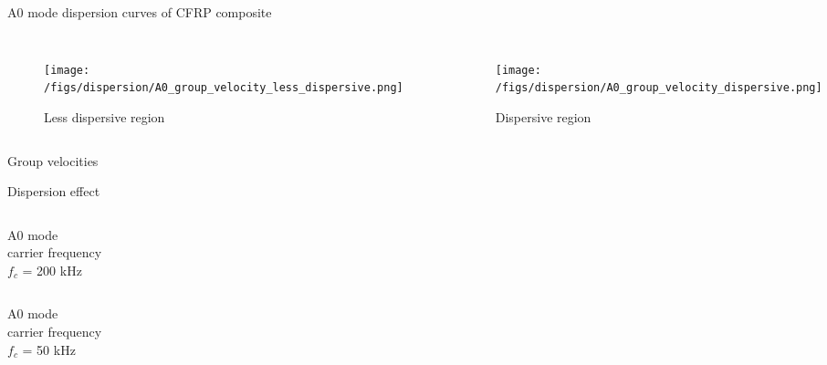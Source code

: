 \documentclass[10pt,aspectratio=169,dvipsnames]{beamer} %
\begin{document}
\begin{frame}{A0 mode dispersion curves of CFRP composite}
	\begin{columns}[T]
			\begin{figure}
				\texttt{[image: /figs/dispersion/A0\_group\_velocity\_less\_dispersive.png]}
				\caption{Less dispersive region}
			\end{figure}
			\begin{figure}
				\texttt{[image: /figs/dispersion/A0\_group\_velocity\_dispersive.png]}
				\caption{Dispersive region}
			\end{figure}
	\end{columns}
	\begin{center}
	\alert{Group velocities}
	\end{center}	
\end{frame}
\begin{frame}{Dispersion effect}
	\begin{columns}[c]
		\begin{column}{0.2\textwidth}
			\centering
			A0 mode \\carrier frequency \\$f_c$ = 200 kHz
		\end{column}
		\begin{column}{0.8\textwidth}
			\begin{figure}
			\end{figure}
		\end{column}
	\end{columns}
	\begin{columns}[c]
		\begin{column}{0.2\textwidth}
			\centering
			A0 mode \\carrier frequency \\$f_c$ = 50 kHz
		\end{column}
		\begin{column}{0.8\textwidth}
			\begin{figure}
			\end{figure}
		\end{column}
	\end{columns}
\end{frame}
\end{document}
